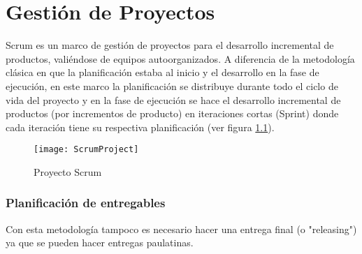 \chapter{Gestión de Proyectos}

Scrum es un marco de gestión de proyectos para el desarrollo incremental de productos, valiéndose de equipos autoorganizados. A diferencia de la metodología clásica en que la planificación estaba al inicio y el desarrollo en la fase de ejecución, en este marco la planificación se distribuye durante todo el ciclo de vida del proyecto y en la fase de ejecución se hace el desarrollo incremental de productos (por incrementos de producto) en iteraciones cortas (Sprint) donde cada iteración tiene su respectiva planificación (ver figura \ref{fig:ScrumProject}).

\begin{figure}[h]
  \centering
  \texttt{[image: ScrumProject]}
  \caption{Proyecto Scrum}
  \centering
  \label{fig:ScrumProject} %
\end{figure}

\subsection{Planificación de entregables}
Con esta metodología tampoco es necesario hacer una entrega final (o "releasing") ya que se pueden hacer entregas paulatinas.

